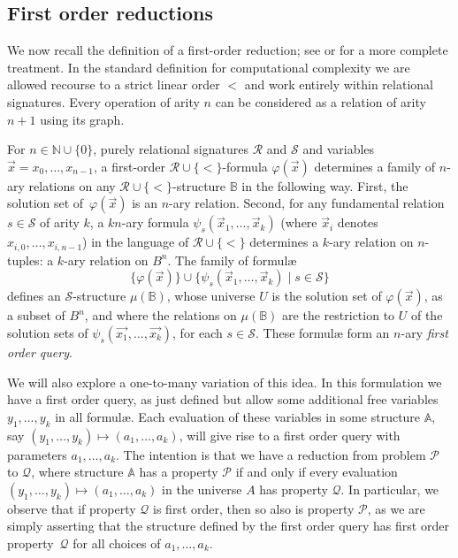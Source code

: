 \documentclass[10pt,a4paper]{amsart}
\theoremstyle{plain}
\theoremstyle{definition}
\begin{document}
\subsection{First order reductions}
We now recall the definition of a first-order reduction; see \cite{imm} or \cite{lib} for a more complete treatment.  In the standard definition for computational complexity we are allowed recourse to a strict linear order $<$ and work entirely within relational signatures.  Every operation of arity $n$ can be considered as a relation of arity $n+1$ using its graph.

For $n\in {\mathbb N}\cup\{0\}$, purely relational signatures $\mathcal R$ and $\mathcal S$ and variables $\vec{x}=x_0,\dots, x_{n-1}$, a first-order ${\mathcal R \cup \{<\}}$-formula $\varphi(\vec{x})$ determines a 
family of $n$-ary relations on any ${\mathcal R \cup \{<\}}$-structure $\mathbb B$ in the following way. First, the solution set of~$\varphi(\vec{x})$ is an $n$-ary relation.  Second, for any
fundamental relation $s\in \mathcal S$ of arity $k$, a $kn$-ary formula  $\psi_s(\vec{x}_1,\dots,\vec{x}_k)$
(where $\vec{x}_i$ denotes $x_{i,0}, \dots , x_{i,n-1}$) in the language of ${\mathcal R \cup \{<\}}$ determines a $k$-ary relation on $n$-tuples: a $k$-ary relation on $B^n$. 
The family of formul{\ae}
\[
\{\varphi(\vec{x})\}\cup\{\psi_s(\vec{x}_1,\dots,\vec{x}_k)\mid s\in\mathcal S\}
\]
defines an ${\mathcal S}$-structure $\mu(\mathbb B)$, whose universe $U$ is the solution set of $\varphi(\vec{x})$, as a subset of $B^n$, and where the relations on $\mu(\mathbb B)$ are the restriction to $U$ of the solution sets of $\psi_{s}(\vec{x_1},\dots,\vec{x_k})$, for each $s\in\mathcal S$. These formul{\ae} form an $n$-ary \emph{first order query}.

We will also explore a one-to-many variation of this idea.  In this formulation we have a first order query, as just defined but allow some additional free variables $y_1,\dots,y_k$ in all formul{\ae}.  Each evaluation of these variables in some structure $\mathbb{A}$, say $(y_1,\dots,y_k)\mapsto(a_1,\dots,a_k)$, will give rise to a first order query with parameters $a_1,\dots,a_k$.  The intention is that we have a reduction from problem $\mathcal{P}$ to $\mathcal{Q}$, where structure $\mathbb{A}$ has a  property $\mathcal{P}$ if and only if  every evaluation $(y_1,\dots,y_k)\mapsto (a_1,\dots,a_k)$ in the universe $A$ has property $\mathcal{Q}$.  In particular, we observe that if property $\mathcal{Q}$ is first order, then so also is property $\mathcal{P}$, as we are simply asserting that the structure defined by the first order query has first order property~$\mathcal{Q}$ for all choices of $a_1,\dots,a_k$.
\end{document}
